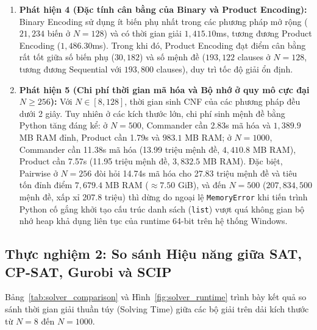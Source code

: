 \documentclass[a4paper,fleqn]{cas-sc}
\begin{document}
\begin{enumerate}
    \item \textbf{Phát hiện 4 (Đặc tính cân bằng của Binary và Product Encoding):} Binary Encoding sử dụng ít biến phụ nhất trong các phương pháp mở rộng ($21{,}234$ biến ở $N=128$) và có thời gian giải $1{,}415.10$ms, tương đương Product Encoding ($1{,}486.30$ms). Trong khi đó, Product Encoding đạt điểm cân bằng rất tốt giữa số biến phụ ($30{,}182$) và số mệnh đề ($193{,}122$ clauses ở $N=128$, tương đương Sequential với $193{,}800$ clauses), duy trì tốc độ giải ổn định.
    \item \textbf{Phát hiện 5 (Chi phí thời gian mã hóa và Bộ nhớ ở quy mô cực đại $N \ge 256$):} Với $N \in [8, 128]$, thời gian sinh CNF của các phương pháp đều dưới 2 giây. Tuy nhiên ở các kích thước lớn, chi phí sinh mệnh đề bằng Python tăng đáng kể: ở $N=500$, Commander cần 2.83s mã hóa và $1{,}389.9$ MB RAM đỉnh, Product cần 1.79s và $983.1$ MB RAM; ở $N=1000$, Commander cần 11.38s mã hóa (13.99 triệu mệnh đề, $4{,}410.8$ MB RAM), Product cần 7.57s (11.95 triệu mệnh đề, $3{,}832.5$ MB RAM). Đặc biệt, Pairwise ở $N=256$ đòi hỏi 14.74s mã hóa cho 27.83 triệu mệnh đề và tiêu tốn đỉnh điểm $7{,}679.4$ MB RAM ($\approx 7.50$ GiB), và đến $N=500$ ($207{,}834{,}500$ mệnh đề, xấp xỉ 207.8 triệu) thì dừng do ngoại lệ \texttt{MemoryError} khi tiến trình Python cố gắng khởi tạo cấu trúc danh sách (\texttt{list}) vượt quá không gian bộ nhớ heap khả dụng liên tục của runtime 64-bit trên hệ thống Windows.
\end{enumerate}

\subsection{Thực nghiệm 2: So sánh Hiệu năng giữa SAT, CP-SAT, Gurobi và SCIP}
Bảng~\ref{tab:solver_comparison} và Hình~\ref{fig:solver_runtime} trình bày kết quả so sánh thời gian giải thuần túy (Solving Time) giữa các bộ giải trên dải kích thước từ $N=8$ đến $N=1000$.
\end{document}
